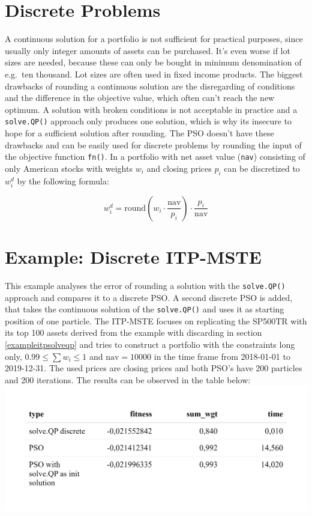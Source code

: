 \documentclass[
  oneside]{book}
\begin{document}
\hypertarget{discrete-problems}{%
\section{Discrete Problems}\label{discrete-problems}}

A continuous solution for a portfolio is not sufficient for practical purposes, since usually only integer amounts of assets can be purchased. It's even worse if lot sizes are needed, because these can only be bought in minimum denomination of e.g.~ten thousand. Lot sizes are often used in fixed income products. The biggest drawbacks of rounding a continuous solution are the disregarding of conditions and the difference in the objective value, which often can't reach the new optimum. A solution with broken conditions is not acceptable in practice and a \texttt{solve.QP()} approach only produces one solution, which is why its insecure to hope for a sufficient solution after rounding. The PSO doesn't have these drawbacks and can be easily used for discrete problems by rounding the input of the objective function \texttt{fn()}. In a portfolio with net asset value (\texttt{nav}) consisting of only American stocks with weights \(w_i\) and closing prices \(p_i\) can be discretized to \(w_i^d\) by the following formula:

\[
  w_i^d =\text{round}(w_i \cdot \frac{\text{nav}}{p_i})\cdot \frac{p_i}{\text{nav}}
\]

\hypertarget{example-discrete-itp-mste}{%
\section{Example: Discrete ITP-MSTE}\label{example-discrete-itp-mste}}

This example analyses the error of rounding a solution with the \texttt{solve.QP()} approach and compares it to a discrete PSO. A second discrete PSO is added, that takes the continuous solution of the \texttt{solve.QP()} and uses it as starting position of one particle. The ITP-MSTE focuses on replicating the SP500TR with its top 100 assets derived from the example with discarding in section \ref{exampleitpsolveqp} and tries to construct a portfolio with the constraints long only, \(0.99 \leq \textstyle\sum w_i \leq 1\) and \(\text{nav} = 10000\) in the time frame from 2018-01-01 to 2019-12-31. The used prices are closing prices and both PSO's have 200 particles and 200 iterations. The results can be observed in the table below:
\includegraphics{Master_Thesis_files/figure-latex/pso9-1.png}
\end{document}
